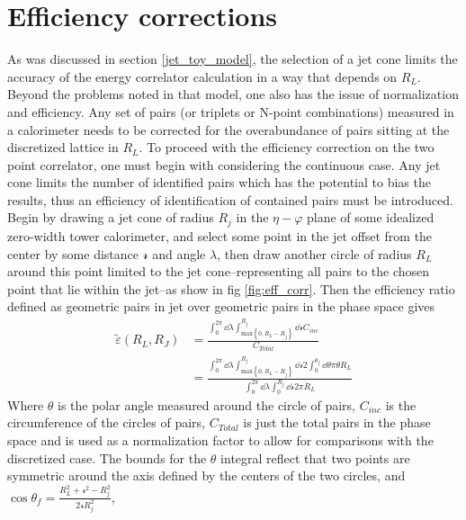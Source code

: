 \section{Efficiency corrections}
	As was discussed in section \ref{jet_toy_model}, the selection of a jet cone limits the accuracy of the energy correlator calculation in a way that depends on $R_L$. 
	Beyond the problems noted in that model, one also has the issue of normalization and efficiency. 
	Any set of pairs (or triplets or N-point combinations) measured in a calorimeter needs to be corrected for the overabundance of pairs sitting at the discretized lattice in $R_L$. 
	To proceed with the efficiency correction on the two point correlator, one must begin with considering the continuous case. 
	Any jet cone limits the number of identified pairs which has the potential to bias the results, thus an efficiency of identification of contained pairs must be introduced.
	Begin by drawing a jet cone of radius $R_j$ in the $\eta-\varphi$ plane of some idealized zero-width tower calorimeter, and select some point in the jet offset from the center by some distance $\mathscr{r}$ and angle $\lambda$, then draw another circle of radius $R_L$ around this point limited to the jet cone--representing all pairs to the chosen point that lie within the jet--as show in fig \ref{fig:eff_corr}. Then the efficiency ratio defined as geometric pairs in jet over geometric pairs in the phase space gives
	\begin{equation}
		\begin{split}
			\tilde{\varepsilon} \left( R_L , R_J \right) 	&= \frac{\int_{0}^{2 \pi} \dd \lambda \int_{\textrm{max}\left\{0,R_{L}-R_j\right\}}^{R_{j}} \dd \mathcal{r} C_{inc}}{C_{Total}} \\
									&= \frac{\int_{0}^{2 \pi} \dd \lambda \int_{\textrm{max}\left\{0, R_L-R_j \right\} }^{R_j} \dd \mathcal{r} 2\int_{0}^{\theta_f} \dd \theta \pi \theta R_L}{\int_{0}^{2 \pi} \dd \lambda \int_{0}^{R_j} \dd \mathcal{r} 2 \pi R_L}
		\end{split}
		\label{eq:eff_cont_set}
	\end{equation}
	Where $\theta$ is the polar angle measured around the circle of pairs, $C_{inc}$ is the circumference of the circles of pairs, $C_{Total}$  is just the total pairs in the phase space and is used as a normalization factor to allow for comparisons with the discretized case.
	The bounds for the $\theta$ integral reflect that two points are symmetric around the axis defined by the centers of the two circles, and $\cos \theta_f = \frac{R_L^2 + \mathcal{r}^2 - R_j^2}{2 \mathcal{r} R_j^2}$, 
